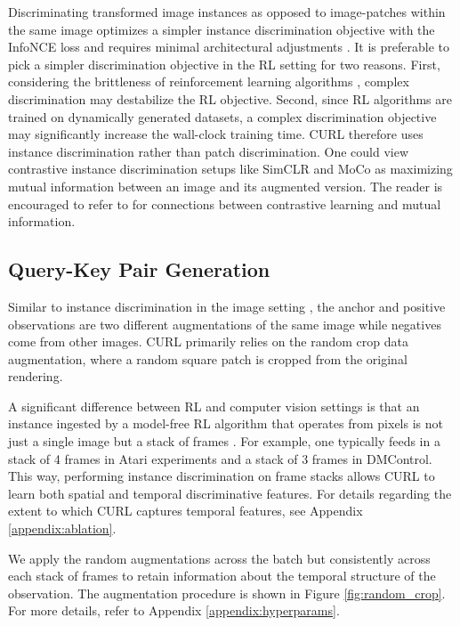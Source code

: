 Discriminating transformed image instances as opposed to image-patches within the same image optimizes a simpler instance discrimination objective \cite{wu2018unsupervised} with the InfoNCE loss and requires minimal architectural adjustments \cite{kaiming2019moco, chen2020simclr}. It is preferable to pick a simpler discrimination objective in the RL setting for two reasons. First, considering the brittleness of reinforcement learning algorithms \cite{henderson2018deep}, complex discrimination may destabilize the RL objective. Second, since RL algorithms are trained on dynamically generated datasets, a complex discrimination objective may significantly increase the wall-clock training time. CURL therefore uses instance discrimination rather than patch discrimination.  One could view contrastive instance discrimination setups like SimCLR and MoCo as maximizing mutual information between an image and its augmented version. The reader is encouraged to refer to \citet{oord2018representation, hjelm2018learning, tschannen2019mutual} for connections between contrastive learning and mutual information. 


\subsection{Query-Key Pair Generation}
Similar to instance discrimination in the image setting \cite{kaiming2019moco, chen2020simclr}, the anchor and positive observations are two different augmentations of the same image while negatives come from other images. CURL primarily relies on the random crop data augmentation, where a random square patch is cropped from the original rendering.

A significant difference between RL and computer vision settings is that an instance ingested by a model-free RL algorithm that operates from pixels is not just a single image but a stack of frames \cite{mnih2015human}. For example, one typically feeds in a stack of 4 frames in Atari experiments and a stack of 3 frames in DMControl. This way, performing instance discrimination on frame stacks allows CURL to learn both spatial and temporal discriminative features. For details regarding the extent to which CURL captures temporal features, see Appendix \ref{appendix:ablation}.

We apply the random augmentations across the batch but consistently across each stack of frames to retain information about the temporal structure of the observation. The augmentation procedure is shown in Figure \ref{fig:random_crop}. For more details, refer to Appendix \ref{appendix:hyperparams}.

